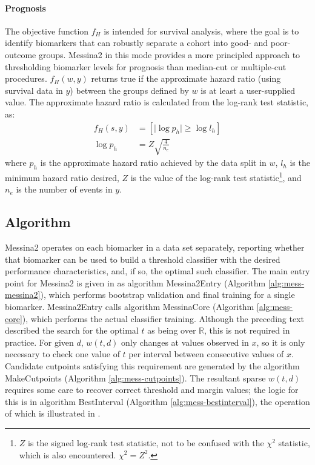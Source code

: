 \documentclass[dissertation.tex]{subfiles}
\begin{document}
\paragraph{Prognosis}
The objective function $f_H$ is intended for survival analysis, where the goal is to identify biomarkers that can robustly separate a cohort into good- and poor-outcome groups.  Messina2 in this mode provides a more principled approach to thresholding biomarker levels for prognosis than median-cut or multiple-cut procedures.  $f_H(w, y)$ returns $\mathrm{true}$ if the approximate hazard ratio (using survival data in $y$) between the groups defined by $w$ is at least a user-supplied value.  The approximate hazard ratio is calculated from the log-rank test statistic, as:
\begin{align*}
f_H(s, y) &= \left[ \vert \log{p_h} \vert \geq \log{l_h} \right] \\
\log{p_h} &= Z\sqrt{\frac{4}{n_e}}
\end{align*}
where $p_h$ is the approximate hazard ratio achieved by the data split in $w$, $l_h$ is the minimum hazard ratio desired, $Z$ is the value of the log-rank test statistic\footnote{$Z$ is the signed log-rank test statistic, not to be confused with the $\chi^2$ statistic, which is also encountered.  $\chi^2 = Z^2$.}, and $n_e$ is the number of events in $y$.

\subsection{Algorithm}
Messina2 operates on each biomarker in a data set separately, reporting whether that biomarker can be used to build a threshold classifier with the desired performance characteristics, and, if so, the optimal such classifier.  The main entry point for Messina2 is given in as algorithm Messina2Entry (Algorithm \ref{alg:mess-messina2}), which performs bootstrap validation and final training for a single biomarker.  Messina2Entry calls algorithm MessinaCore (Algorithm \ref{alg:mess-core}), which performs the actual classifier training.  Although the preceding text described the search for the optimal $t$ as being over $\mathbb{R}$, this is not required in practice.  For given $d$, $w(t,d)$ only changes at values observed in $x$, so it is only necessary to check one value of $t$ per interval between consecutive values of $x$.  Candidate cutpoints satisfying this requirement are generated by the algorithm MakeCutpoints (Algorithm \ref{alg:mess-cutpoints}).  The resultant sparse $w(t,d)$ requires some care to recover correct threshold and margin values; the logic for this is in algorithm BestInterval (Algorithm \ref{alg:mess-bestinterval}), the operation of which is illustrated in .
\end{document}
